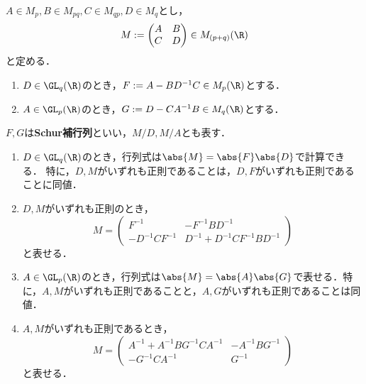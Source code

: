 \documentclass[uplatex, dvipdfmx]{jsreport}
\begin{document}
\begin{notation}
    $A\in M_{p},B\in M_{pq},C\in M_{qp},D\in M_q$とし，
    \[M:=\begin{pmatrix}A&B\\C&D\end{pmatrix}\in M_{(p+q)}(\R)\]
    と定める．
    \begin{enumerate}
        \item $D\in\GL_q(\R)$のとき，$F:=A-BD^{-1}C\in M_{p}(\R)$とする．
        \item $A\in\GL_p(\R)$のとき，$G:=D-CA^{-1}B\in M_q(\R)$とする．
    \end{enumerate}
    $F,G$は\textbf{Schur補行列}といい，$M/D,M/A$とも表す．
\end{notation}

\begin{theorem}[ブロック行列の逆行列の表現]\mbox{}
    \begin{enumerate}
        \item $D\in\GL_q(\R)$のとき，行列式は$\abs{M}=\abs{F}\abs{D}$で計算できる．
        特に，$D,M$がいずれも正則であることは，$D,F$がいずれも正則であることに同値．
        \item $D,M$がいずれも正則のとき，
        \[M=\begin{pmatrix}F^{-1}&-F^{-1}BD^{-1}\\-D^{-1}CF^{-1}&D^{-1}+D^{-1}CF^{-1}BD^{-1}\end{pmatrix}\]
        と表せる．
        \item $A\in\GL_p(\R)$のとき，行列式は$\abs{M}=\abs{A}\abs{G}$で表せる．特に，$A,M$がいずれも正則であることと，$A,G$がいずれも正則であることは同値．
        \item $A,M$がいずれも正則であるとき，
        \[M=\begin{pmatrix}A^{-1}+A^{-1}BG^{-1}CA^{-1}&-A^{-1}BG^{-1}\\-G^{-1}CA^{-1}&G^{-1}\end{pmatrix}\]
        と表せる．
    \end{enumerate}
\end{theorem}
\end{document}
